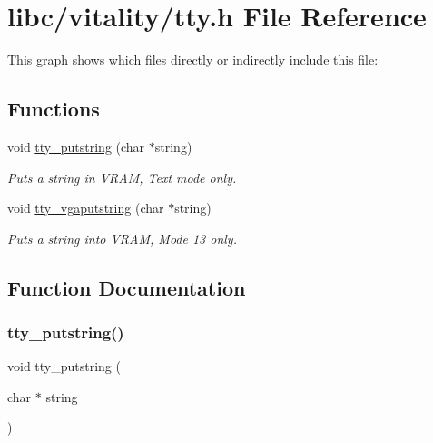 \hypertarget{a00044}{}\section{libc/vitality/tty.h File Reference}
\label{a00044}
This graph shows which files directly or indirectly include this file\+:
\subsection*{Functions}
\begin{DoxyCompactItemize}
\item 
void \hyperlink{a00044_a2ebb962f457a2677d70285d1c0f9be12_a2ebb962f457a2677d70285d1c0f9be12}{tty\+\_\+putstring} (char $\ast$string)
\begin{DoxyCompactList}\small\item\em Puts a string in V\+R\+AM, Text mode only. \end{DoxyCompactList}\item 
void \hyperlink{a00044_a13ff2c06d56753c5666ca56cb2d81100_a13ff2c06d56753c5666ca56cb2d81100}{tty\+\_\+vgaputstring} (char $\ast$string)
\begin{DoxyCompactList}\small\item\em Puts a string into V\+R\+AM, Mode 13 only. \end{DoxyCompactList}\end{DoxyCompactItemize}


\subsection{Function Documentation}
\mbox{\label{a00044_a2ebb962f457a2677d70285d1c0f9be12_a2ebb962f457a2677d70285d1c0f9be12}} 
\subsubsection{\texorpdfstring{tty\+\_\+putstring()}{tty\_putstring()}}
{\footnotesize\ttfamily void tty\+\_\+putstring (\begin{DoxyParamCaption}\item[{char $\ast$}]{string }\end{DoxyParamCaption})}



